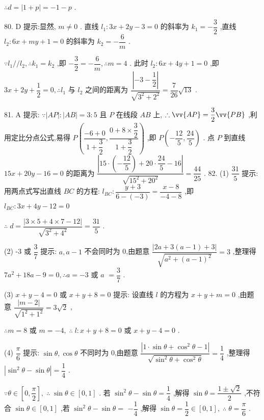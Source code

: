 $\therefore d = \left| {1 + p}\right|  =  - 1 - p$ .

80. D 提示:显然, $m \neq  0$ . 直线 ${l}_{1} : {3x} + {2y} - 3 = 0$ 的斜率为 ${k}_{1} =  - \dfrac{3}{2}$ ,直线 ${l}_{2} : {6x} + {my} + 1 = 0$ 的斜率为 ${k}_{2} =  - \dfrac{6}{m}$ .

$\because {l}_{1}//{l}_{2},\therefore {k}_{1} = {k}_{2}$ ,即 $- \dfrac{3}{2} =  - \dfrac{6}{m},\therefore m = 4$ . 此时 ${l}_{2} : {6x} + {4y} + 1 = 0$ ,即 ${3x} + {2y} + \dfrac{1}{2} = 0,\therefore {l}_{1}$ 与 ${l}_{2}$ 之间的距离为 $\dfrac{\left| -3 - \dfrac{1}{2}\right| }{\sqrt{{3}^{2} + {2}^{2}}} = \dfrac{7}{26}\sqrt{13}$ .

81. A 提示: $\because \left| {AP}\right|  : \left| {AB}\right|  = 3 : 5$ 且 $P$ 在线段 ${AB}$ 上, $\therefore \vv{AP} = \dfrac{3}{2}\vv{PB}$ ,利用定比分点公式,易得 $P\left( {\dfrac{-6 + 0}{1 + \dfrac{3}{2}},\dfrac{0 + 8 \times  \dfrac{3}{2}}{1 + \dfrac{3}{2}}}\right)$ ,即 $P\left( {-\dfrac{12}{5},\dfrac{24}{5}}\right)$ . 点 $P$ 到直线 ${15x} + {20y} - {16} = 0$ 的距离为 $\dfrac{\left| {15} \cdot  \left( -\dfrac{12}{5}\right)  + {20} \cdot  \dfrac{24}{5} - {16}\right| }{\sqrt{{15}^{2} + {20}^{2}}} = \dfrac{44}{25}$ . 82. (1) $\dfrac{31}{5}$ 提示: 用两点式写出直线 ${BC}$ 的方程: ${l}_{BC} : \dfrac{y + 3}{6 - \left( {-3}\right) } = \dfrac{x - 8}{-4 - 8}$ ,即 ${l}_{BC} : {3x} + {4y} - {12} = 0$

$\therefore \;d = \dfrac{\left| 3 \times  5 + 4 \times  7 - {12}\right| }{\sqrt{{3}^{2} + {4}^{2}}} = \dfrac{31}{5}$ .

(2) -3 或 $\dfrac{3}{7}$ 提示: $a,a - 1$ 不会同时为 0,由题意 $\dfrac{\left| 2a + 3\left( a - 1\right)  + 3\right| }{\sqrt{{a}^{2} + {\left( a - 1\right) }^{2}}} = 3$ ,整理得 $7{a}^{2} + {18a} - 9 = 0,\therefore a =  - 3$ 或 $a$  $= \dfrac{3}{7}$ .

(3) $x + y - 4 = 0$ 或 $x + y + 8 = 0$ 提示: 设直线 $l$ 的方程为 $x + y + m = 0$ ,由题意 $\dfrac{\left| m - 2\right| }{\sqrt{{1}^{2} + {1}^{2}}} = 3\sqrt{2}$ ,

$\therefore m = 8$ 或 $m =  - 4,\;\therefore \;l : x + y + 8 = 0$ 或 $x + y - 4 = 0$ .

(4) $\dfrac{\pi }{6}$ 提示: $\sin \theta ,\cos \theta$ 不同时为 0,由题意 $\dfrac{\left| 1 \cdot  \sin \theta  + {\cos }^{2}\theta  - 1\right| }{\sqrt{{\sin }^{2}\theta  + {\cos }^{2}\theta }} = \dfrac{1}{4}$ ,整理得 $\left| {{\sin }^{2}\theta  - \sin \theta }\right|  = \dfrac{1}{4}$ .

$\because \theta  \in  \left\lbrack  {0,\dfrac{\pi }{2}}\right\rbrack  ,\;\therefore \;\sin \theta  \in  \left\lbrack  {0,1}\right\rbrack$ . 若 ${\sin }^{2}\theta  - \sin \theta  = \dfrac{1}{4}$ ,解得 $\sin \theta  = \dfrac{1 \pm  \sqrt{2}}{2}$ ,不符合 $\sin \theta  \in  \left\lbrack  {0,1}\right\rbrack$ ,若 ${\sin }^{2}\theta  - \sin \theta  =$  $- \dfrac{1}{4}$ ,解得 $\sin \theta  = \dfrac{1}{2} \in  \left\lbrack  {0,1}\right\rbrack  ,\;\therefore \;\theta  = \dfrac{\pi }{6}$ .

